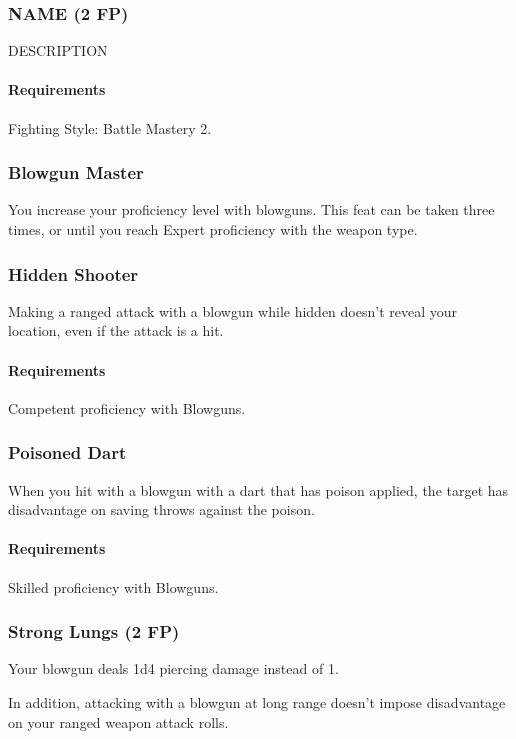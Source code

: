 \subsubsection{NAME (2 FP)} \label{feat::name}
    DESCRIPTION
    \paragraph{Requirements} Fighting Style: Battle Mastery 2.

\subsubsection{Blowgun Master} \label{feat::blowgunmaster}
    You increase your proficiency level with blowguns.
    This feat can be taken three times, or until you reach Expert proficiency with the weapon type.
\subsubsection{Hidden Shooter} \label{feat::hiddenshooter}
    Making a ranged attack with a blowgun while hidden doesn't reveal your location, even if the attack is a hit.
    \paragraph{Requirements} Competent proficiency with Blowguns.
\subsubsection{Poisoned Dart} \label{feat::poisoneddart}
    When you hit with a blowgun with a dart that has poison applied, the target has disadvantage on saving throws against the poison.
    \paragraph{Requirements} Skilled proficiency with Blowguns.
\subsubsection{Strong Lungs (2 FP)} \label{feat::stronglungs}
    Your blowgun deals 1d4 piercing damage instead of 1.

    In addition, attacking with a blowgun at long range doesn't impose disadvantage on your ranged weapon attack rolls.
